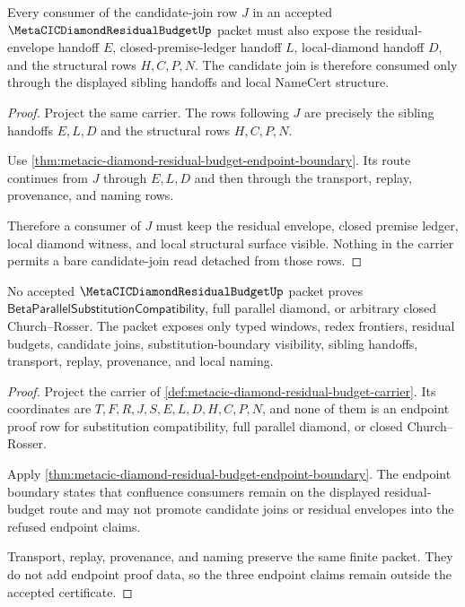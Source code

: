 \begin{theorem}
\label{thm:metacic-diamond-residual-budget-obligation-candidate-join-visibility}
Every consumer of the candidate-join row $J$ in an accepted
$\MetaCICDiamondResidualBudgetUp$ packet must also expose the residual-envelope
handoff $E$, closed-premise-ledger handoff $L$, local-diamond handoff $D$, and
the structural rows $H,C,P,N$. The candidate join is therefore consumed only
through the displayed sibling handoffs and local NameCert structure.
\end{theorem}
\begin{proof}
Project the same carrier. The rows following $J$ are precisely the sibling
handoffs $E,L,D$ and the structural rows $H,C,P,N$.

Use \autoref{thm:metacic-diamond-residual-budget-endpoint-boundary}. Its route
continues from $J$ through $E,L,D$ and then through the transport, replay,
provenance, and naming rows.

Therefore a consumer of $J$ must keep the residual envelope, closed premise
ledger, local diamond witness, and local structural surface visible. Nothing
in the carrier permits a bare candidate-join read detached from those rows.
\end{proof}

\begin{theorem}
\label{thm:metacic-diamond-residual-budget-obligation-endpoint-nonescape}
No accepted $\MetaCICDiamondResidualBudgetUp$ packet proves
$\mathsf{BetaParallelSubstitutionCompatibility}$, full parallel diamond, or
arbitrary closed Church--Rosser. The packet exposes only typed windows, redex
frontiers, residual budgets, candidate joins, substitution-boundary visibility,
sibling handoffs, transport, replay, provenance, and local naming.
\end{theorem}
\begin{proof}
Project the carrier of
\autoref{def:metacic-diamond-residual-budget-carrier}. Its coordinates are
$T,F,R,J,S,E,L,D,H,C,P,N$, and none of them is an endpoint proof row for
substitution compatibility, full parallel diamond, or closed Church--Rosser.

Apply
\autoref{thm:metacic-diamond-residual-budget-endpoint-boundary}. The endpoint
boundary states that confluence consumers remain on the displayed
residual-budget route and may not promote candidate joins or residual
envelopes into the refused endpoint claims.

Transport, replay, provenance, and naming preserve the same finite packet.
They do not add endpoint proof data, so the three endpoint claims remain
outside the accepted certificate.
\end{proof}

